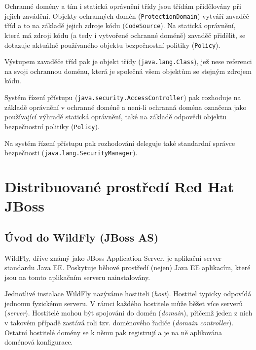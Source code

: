 Ochranné domény a tím i statická oprávnění třídy jsou třídám přidělovány při jejich zavádění. Objekty ochranných domén ({\tt ProtectionDomain}) vytváří zavaděč tříd a to na základě jejich zdroje kódu ({\tt CodeSource}). Na statická oprávnění, která má zdroji kódu (a tedy i vytvořené ochranné doméně) zavaděč přidělit, se dotazuje aktuálně používaného objektu bezpečnostní politiky ({\tt Policy}).

Výstupem zavaděče tříd pak je objekt třídy ({\tt java.lang.Class}), jež nese referenci na svoji ochrannou doménu, která je společná všem objektům se stejným zdrojem kódu.

Systém řízení přístupu ({\tt java.security.AccessController}) pak rozhoduje na základě oprávnění v ochranné doméně a není-li ochranná doména označena jako používající výhradě statická oprávnění, také na základě odpovědi objektu bezpečnostní politiky ({\tt Policy}).

Na systém řízení přístupu pak rozhodování deleguje také standardní správce bezpečnosti ({\tt java.lang.SecurityManager}).


\chapter{Distribuované prostředí Red Hat JBoss} \label{jboss}

\section{Úvod do WildFly (JBoss AS)}

WildFly, dříve známý jako JBoss Application Server, je aplikační server standardu Java EE.
Poskytuje běhové prostředí (nejen) Java EE aplikacím, které jsou na tomto aplikačním serveru nainstalovány.
\cite{wildflyRename}

Jednotlivé instalace WildFly nazýváme hostiteli ({\it host}). Hostitel typicky odpovídá jednomu fyzickému serveru.
V rámci každého hostitele může běžet více serverů ({\it server}).
Hostitelé mohou být spojováni do domén ({\it domain}), přičemž jeden z nich v takovém případě zastává roli tzv. doménového řadiče ({\it domain controller}).
Ostatní hostitelé domény se k němu pak registrují a je na ně aplikována doménová konfigurace.
\cite{jbossDomainSetup}

